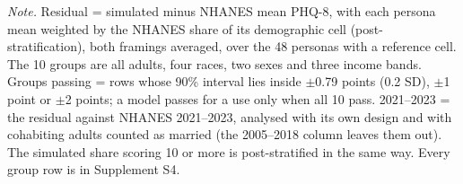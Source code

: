 \begin{table}[tp]
\centering
\caption{Level 3: Post-Stratified Residual of the Simulated Population Against NHANES}
\label{tab:l3}
\small
\setlength{\tabcolsep}{3.5pt}
\vspace{4pt}
\begin{tabnote}
\textit{Note.} Residual = simulated minus NHANES mean PHQ-8, with each persona mean weighted by the NHANES share of its demographic cell (post-stratification), both framings averaged, over the 48 personas with a reference cell. The 10 groups are all adults, four races, two sexes and three income bands. Groups passing = rows whose 90\% interval lies inside $\pm$0.79 points (0.2 SD), $\pm$1 point or $\pm$2 points; a model passes for a use only when all 10 pass. 2021--2023 = the residual against NHANES 2021--2023, analysed with its own design and with cohabiting adults counted as married (the 2005--2018 column leaves them out). The simulated share scoring 10 or more is post-stratified in the same way. Every group row is in Supplement S4.
\end{tabnote}
\end{table}
